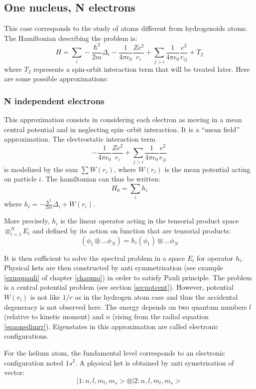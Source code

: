 \documentclass[12pt]{book}
\begin{document}
\subsection{One nucleus, N electrons}
This case corresponds to the study of atoms different from hydrogenoids
atoms. The Hamiltonian describing the problem is:
\begin{equation}
H=\sum_i-\frac{\hbar^2}{2m}\Delta_i-
\frac{1}{4\pi\epsilon_0}\frac{Ze^2}{r_i}+ \sum_{j\mathrel{>}
i}\frac{1}{4\pi\epsilon_0}\frac{e^2}{r_{ij}}+T_2 
\end{equation}
where $T_2$ represents a spin-orbit interaction term that will be treated
later. Here are some possible approximations:
\subsubsection{N independent electrons}
This approximation consists in considering each electron as moving in a mean
central potential and in neglecting spin--orbit interaction. It is a ``mean
field'' approximation. The electrostatic interaction term
\begin{equation}
-\frac{1}{4\pi\epsilon_0}\frac{Ze^2}{r_i}+\sum_{j\mathrel{>}
i}\frac{1}{4\pi\epsilon_0}\frac{e^2}{r_{ij}}
\end{equation}
is modelized by the sum $\sum W(r_i)$, where $W(r_i)$ is the mean potential
acting on particle $i$. The hamiltonian can thus be written:
\begin{equation}
H_0=\sum_ih_i
\end{equation}
where $h_i=-\frac{\hbar^2}{2m}\Delta_i+W(r_i)$.
\begin{rem}
More precisely, $h_i$ is the linear operator acting in the tensorial
product space $\otimes_{i=1}^N E_i$ and defined by its action on function that are
tensorial products:
\begin{equation}
[1_1\otimes\dots\otimes 1_{i-1}\otimes h_i \otimes 1_{i+1}\dots\otimes
1_{N}] 
(\phi_1\otimes\dots\phi_N)
=h_i(\phi_1)\otimes\dots\phi_N 
\end{equation}
\end{rem}
It is then sufficient to solve the spectral problem in a space
$E_i$ for operator $h_i$. Physical kets are then constructed by
anti symmetrisation (see example \ref{exmppauli} of chapter \ref{chapmq}) in
order to satisfy Pauli principle.
The problem is a central potential problem (see section
\ref{secpotcent}). However, potential $W(r_i)$ is not like $1/r$ as in the
hydrogen atom case and thus the accidental degeneracy is not 
observed here. The energy depends on two quantum numbers $l$ (relative
to kinetic 
moment) and $n$ (rising from the radial equation \ref{eqaonedimrr}).
Eigenstates in this approximation are called electronic configurations. 
\begin{exmp}
For the helium atom, the fundamental level corresponds to an electronic
configuration noted $1s^2$. A physical ket is obtained by anti symetrisation of
vector:
\begin{equation}
|1:n,l,m_l,m_s>\otimes|2:n,l,m_l,m_s>
\end{equation}
\end{exmp}
\end{document}
